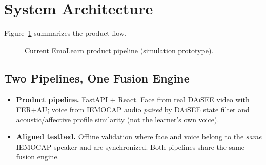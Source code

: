 \documentclass[conference]{IEEEtran}
\begin{document}
\section{System Architecture}
\label{sec:arch}

Figure~\ref{fig:pipeline} summarizes the product flow.

\begin{figure}[!t]
\centering
{}
\caption{Current EmoLearn product pipeline (simulation prototype).}
\label{fig:pipeline}
\end{figure}

\subsection{Two Pipelines, One Fusion Engine}
\begin{itemize}
\item \textbf{Product pipeline.} FastAPI + React. Face from real \textsc{DAiSEE}
video with FER+AU; voice from \textsc{IEMOCAP} audio \emph{paired} by DAiSEE
state filter and acoustic/affective profile similarity (not the learner's own
voice).
\item \textbf{Aligned testbed.} Offline validation where face and voice belong
to the \emph{same} IEMOCAP speaker and are synchronized. Both pipelines share
the same fusion engine.
\end{itemize}
\end{document}
